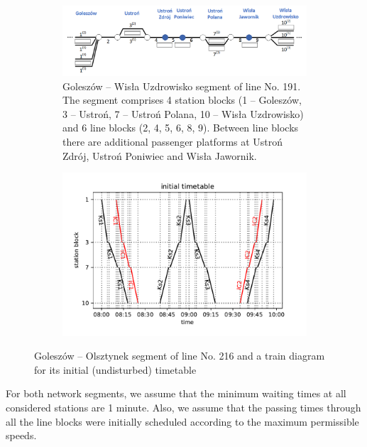 \begin{figure}
  \begin{subfigure}{\textwidth}
    \includegraphics[width=\textwidth]{figures/line.pdf}
    \caption{Goleszów -- Wisła Uzdrowisko segment of line No. 191. The segment comprises 4 station blocks (1 -- Goleszów, 3 -- Ustroń, 7 -- Ustroń Polana, 10 -- Wisła Uzdrowisko) and 6 line blocks (2, 4, 5, 6, 8, 9). Between line blocks there are additional passenger platforms at Ustroń Zdrój, Ustroń Poniwiec and Wisła Jawornik.
    }
    \label{fig:line}
  \end{subfigure}
  \begin{subfigure}{\textwidth}
    \includegraphics[width=\textwidth]{figures/train_diagram}
    \label{fig:diagram}
  \end{subfigure}
  \caption{Goleszów -- Olsztynek segment of line No. 216 and a train diagram for its initial (undisturbed) timetable}
\end{figure}

For both network segments, we assume that the minimum waiting times at all considered stations
are 1 minute. Also, we assume that the passing times through all the line blocks were initially
scheduled according to the maximum permissible speeds.


